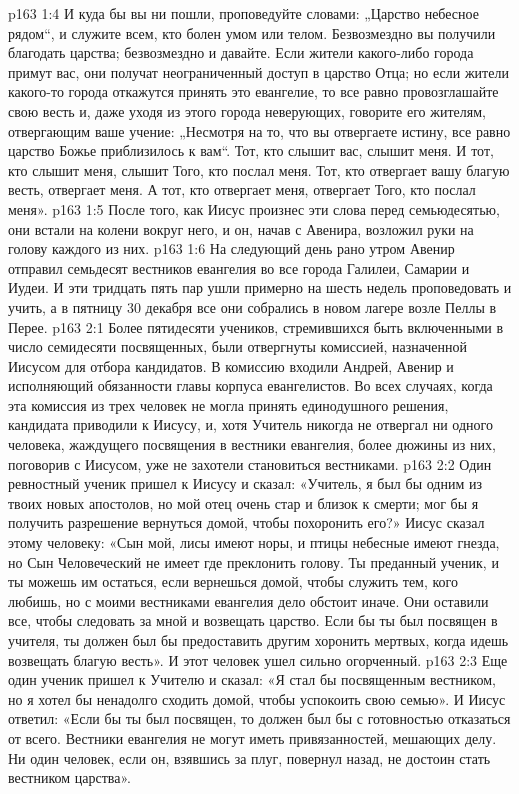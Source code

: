 \vs p163 1:4 И куда бы вы ни пошли, проповедуйте словами: „Царство небесное рядом“, и служите всем, кто болен умом или телом. Безвозмездно вы получили благодать царства; безвозмездно и давайте. Если жители какого\hyp{}либо города примут вас, они получат неограниченный доступ в царство Отца; но если жители какого\hyp{}то города откажутся принять это евангелие, то все равно провозглашайте свою весть и, даже уходя из этого города неверующих, говорите его жителям, отвергающим ваше учение: „Несмотря на то, что вы отвергаете истину, все равно царство Божье приблизилось к вам“. Тот, кто слышит вас, слышит меня. И тот, кто слышит меня, слышит Того, кто послал меня. Тот, кто отвергает вашу благую весть, отвергает меня. А тот, кто отвергает меня, отвергает Того, кто послал меня».
\vs p163 1:5 После того, как Иисус произнес эти слова перед семьюдесятью, они встали на колени вокруг него, и он, начав с Авенира, возложил руки на голову каждого из них.
\vs p163 1:6 На следующий день рано утром Авенир отправил семьдесят вестников евангелия во все города Галилеи, Самарии и Иудеи. И эти тридцать пять пар ушли примерно на шесть недель проповедовать и учить, а в пятницу 30 декабря все они собрались в новом лагере возле Пеллы в Перее.
\vs p163 2:1 Более пятидесяти учеников, стремившихся быть включенными в число семидесяти посвященных, были отвергнуты комиссией, назначенной Иисусом для отбора кандидатов. В комиссию входили Андрей, Авенир и исполняющий обязанности главы корпуса евангелистов. Во всех случаях, когда эта комиссия из трех человек не могла принять единодушного решения, кандидата приводили к Иисусу, и, хотя Учитель никогда не отвергал ни одного человека, жаждущего посвящения в вестники евангелия, более дюжины из них, поговорив с Иисусом, уже не захотели становиться вестниками.
\vs p163 2:2 \pc Один ревностный ученик пришел к Иисусу и сказал: «Учитель, я был бы одним из твоих новых апостолов, но мой отец очень стар и близок к смерти; мог бы я получить разрешение вернуться домой, чтобы похоронить его?» Иисус сказал этому человеку: «Сын мой, лисы имеют норы, и птицы небесные имеют гнезда, но Сын Человеческий не имеет где преклонить голову. Ты преданный ученик, и ты можешь им остаться, если вернешься домой, чтобы служить тем, кого любишь, но с моими вестниками евангелия дело обстоит иначе. Они оставили все, чтобы следовать за мной и возвещать царство. Если бы ты был посвящен в учителя, ты должен был бы предоставить другим хоронить мертвых, когда идешь возвещать благую весть». И этот человек ушел сильно огорченный.
\vs p163 2:3 Еще один ученик пришел к Учителю и сказал: «Я стал бы посвященным вестником, но я хотел бы ненадолго сходить домой, чтобы успокоить свою семью». И Иисус ответил: «Если бы ты был посвящен, то должен был бы с готовностью отказаться от всего. Вестники евангелия не могут иметь привязанностей, мешающих делу. Ни один человек, если он, взявшись за плуг, повернул назад, не достоин стать вестником царства».
